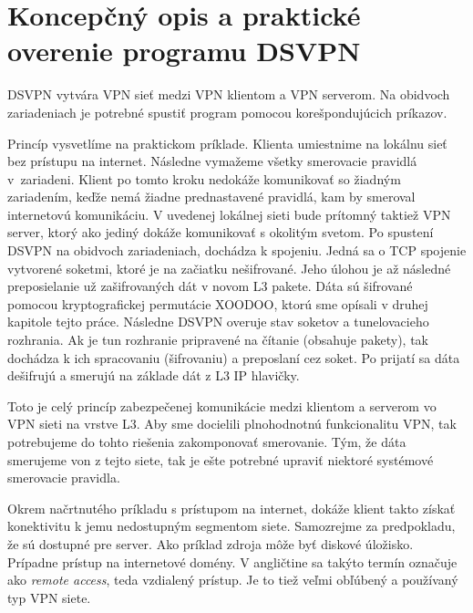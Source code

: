 \section{Koncepčný opis a praktické overenie programu DSVPN}
DSVPN vytvára VPN sieť medzi VPN klientom a VPN serverom. Na obidvoch zariadeniach je potrebné spustiť program pomocou korešpondujúcich príkazov. 

Princíp vysvetlíme na praktickom príklade. Klienta umiestnime na lokálnu sieť bez prístupu na internet. Následne vymažeme všetky smerovacie pravidlá v~zariadeni. Klient po tomto kroku nedokáže komunikovať so žiadným zariadením, keďže nemá žiadne prednastavené pravidlá, kam by smeroval internetovú komunikáciu. V uvedenej lokálnej sieti bude prítomný taktiež VPN server, ktorý ako jediný dokáže komunikovať s okolitým svetom. Po spustení DSVPN na obidvoch zariadeniach, dochádza k spojeniu. Jedná sa o TCP spojenie vytvorené soketmi, ktoré je na začiatku nešifrované. Jeho úlohou je až následné preposielanie už zašifrovaných dát v novom L3 pakete. Dáta sú šifrované pomocou kryptografickej permutácie XOODOO, ktorú sme opísali v druhej kapitole tejto práce. Následne DSVPN overuje stav soketov a tunelovacieho rozhrania. Ak je tun rozhranie pripravené na čítanie (obsahuje pakety), tak dochádza k ich spracovaniu (šifrovaniu) a preposlaní cez soket. Po prijatí sa dáta dešifrujú a smerujú na základe dát z L3 IP hlavičky. 

Toto je celý princíp zabezpečenej komunikácie medzi klientom a serverom vo VPN sieti na vrstve L3. Aby sme docielili plnohodnotnú funkcionalitu VPN, tak potrebujeme do tohto riešenia zakomponovať smerovanie. Tým, že dáta smerujeme von z tejto siete, tak je ešte potrebné upraviť niektoré systémové smerovacie pravidla.      

Okrem načrtnutého príkladu s prístupom na internet, dokáže klient takto získať konektivitu k jemu nedostupným segmentom siete. Samozrejme za predpokladu, že sú dostupné pre server. Ako príklad zdroja môže byť diskové úložisko. Prípadne prístup na internetové domény. V angličtine sa takýto termín označuje ako \textit{remote access}, teda vzdialený prístup. Je to tiež veľmi obľúbený a používaný typ VPN siete. 

